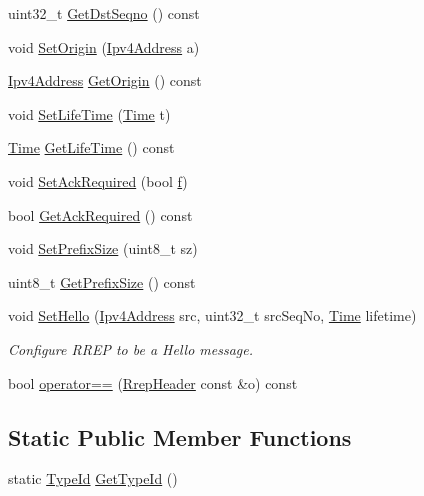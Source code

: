 \begin{DoxyCompactItemize}
\item 
uint32\+\_\+t \hyperlink{classns3_1_1aodv_1_1RrepHeader_a76c7238b790d48653cdf0263db8e2d9d}{Get\+Dst\+Seqno} () const 
\item 
void \hyperlink{classns3_1_1aodv_1_1RrepHeader_a6612c4f48c0172f56a55d53f68c454cf}{Set\+Origin} (\hyperlink{classns3_1_1Ipv4Address}{Ipv4\+Address} a)
\item 
\hyperlink{classns3_1_1Ipv4Address}{Ipv4\+Address} \hyperlink{classns3_1_1aodv_1_1RrepHeader_a45c408ae6d8158f18f84ef59548848e9}{Get\+Origin} () const 
\item 
void \hyperlink{classns3_1_1aodv_1_1RrepHeader_a95081890939769d5c8b7246b89cc5312}{Set\+Life\+Time} (\hyperlink{classns3_1_1Time}{Time} t)
\item 
\hyperlink{classns3_1_1Time}{Time} \hyperlink{classns3_1_1aodv_1_1RrepHeader_a00d049d8a26e6c3de8e1b62bda522a26}{Get\+Life\+Time} () const 
\item 
void \hyperlink{classns3_1_1aodv_1_1RrepHeader_a9c0066da4947c6464c11074825340f60}{Set\+Ack\+Required} (bool \hyperlink{80211b_8c_ae7ffc1a8f84fa47a0812b2f2b9627132}{f})
\item 
bool \hyperlink{classns3_1_1aodv_1_1RrepHeader_af0f0e39d9f358a065dc6d9efa175ee1b}{Get\+Ack\+Required} () const 
\item 
void \hyperlink{classns3_1_1aodv_1_1RrepHeader_a9da4241b9f69a048acaaf8f371140ff8}{Set\+Prefix\+Size} (uint8\+\_\+t sz)
\item 
uint8\+\_\+t \hyperlink{classns3_1_1aodv_1_1RrepHeader_a0842be66cba6cf49a0f94e69b238bd78}{Get\+Prefix\+Size} () const 
\item 
void \hyperlink{classns3_1_1aodv_1_1RrepHeader_a5960806ea7c2d3509073bc00b3ee795a}{Set\+Hello} (\hyperlink{classns3_1_1Ipv4Address}{Ipv4\+Address} src, uint32\+\_\+t src\+Seq\+No, \hyperlink{classns3_1_1Time}{Time} lifetime)
\begin{DoxyCompactList}\small\item\em Configure R\+R\+EP to be a Hello message. \end{DoxyCompactList}\item 
bool \hyperlink{classns3_1_1aodv_1_1RrepHeader_a72c0cd8ee8b72fd6e92e5a8125500aa2}{operator==} (\hyperlink{classns3_1_1aodv_1_1RrepHeader}{Rrep\+Header} const \&o) const 
\end{DoxyCompactItemize}
\subsection*{Static Public Member Functions}
\begin{DoxyCompactItemize}
\item 
static \hyperlink{classns3_1_1TypeId}{Type\+Id} \hyperlink{classns3_1_1aodv_1_1RrepHeader_a59f8b82f9e419441deaada01247cf59a}{Get\+Type\+Id} ()
\end{DoxyCompactItemize}
